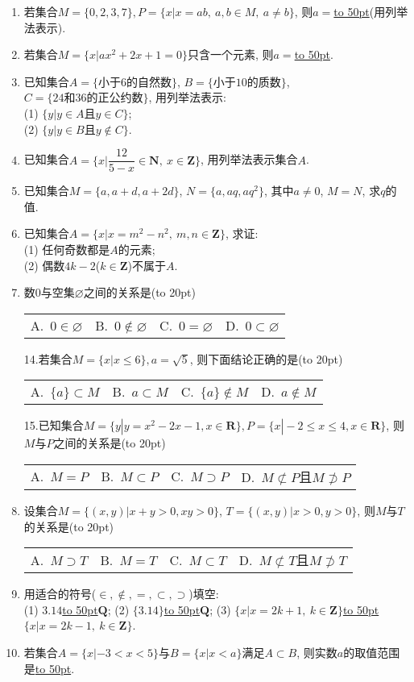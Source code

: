 \documentclass[10pt,a4paper]{article}
\newcommand{\blank}[1]{\underline{\hbox to #1pt{}}}
\newcommand{\bracket}[1]{(\hbox to #1pt{})}
\newcommand{\fourch}[4]{\par\begin{tabular}{p{.23\textwidth}p{.23\textwidth}p{.23\textwidth}p{.23\textwidth}}
A.~#1 &B.~#2& C.~#3& D.~#4
\end{tabular}}
\begin{document}
\begin{enumerate}[1.]
(1) 不大于$6$的非负数整数所组成的集合:\blank{50};\\
(2) 方程$x^3-x^2-x+1=0$的解所组成的集合:\blank{50};\\
(3) $\{y|y=x^2-1, \ |x|\le 2, \ x\in \mathbf{Z}\}$:\blank{50};\\
(4) $\{(x,y)|y =x^2-1, \  |x|\le 2,\ x\in \mathbf{Z}\}$:\blank{50};\\
(5) $\{(x,y)|x+y=5, \ x\in \mathbf{N},\ y\in \mathbf{Z}\}$:\blank{50}.
\item 若集合$M=\{0,2,3,7\},P=\{x|x=ab, \ a,b\in M, \ a\ne b\}$, 则$a=$\blank{50}(用列举法表示).
\item 若集合$M=\{x|ax^2+2x+1=0\}$只含一个元素, 则$a=$\blank{50}.
\item 已知集合$A=\{\text{小于}6\text{的自然数}\}$, $B=\{\text{小于}10\text{的质数}\}$, $C=\{24\text{和}36\text{的正公约数}\}$, 用列举法表示:\\
(1) $\{y|y\in A\text{且}y\in C\}$;\\
(2) $\{y|y\in B\text{且}y\notin C\}$.
\item 已知集合$A=\{x|\dfrac{12}{5-x}\in \mathbf{N},\ x\in\mathbf{Z}\}$, 用列举法表示集合$A$.
\item 已知集合$M=\{a,a+d,a+2d\}$, $N=\{a,aq,aq^2\}$, 其中$a\ne 0$, $M=N$, 求$q$的值.
\item 已知集合$A=\{x|x=m^2-n^2, \ m,n\in \mathbf{Z}\}$, 求证:\\
(1) 任何奇数都是$A$的元素;\\
(2) 偶数$4k-2$($k\in \mathbf{Z}$)不属于$A$.
\item 数0与空集$\varnothing$之间的关系是\bracket{20}
\fourch{$0\in \varnothing$}{$0\notin \varnothing$}{$0=\varnothing$}{$0\subset \varnothing$}14.若集合$M=\{x |x\le 6\},a=\sqrt 5$, 则下面结论正确的是\bracket{20}
\fourch{$\{ a\}\subset M$}{$a\subset M$}{$\{ a\}\notin M$}{$a\notin M$}15.已知集合$M=\{y |y=x^2-2x-1,x\in \mathbf{R}\},P=\{x |-2\le x\le 4,x\in \mathbf{R}\}$, 则$M$与$P$之间的关系是\bracket{20}
\fourch{$M=P$}{$M\subset P$}{$M\supset P$}{$M\not\subset P$且$M\not\supset P$}
\item 设集合$M=\{ (x,y)| x+y>0,xy>0 \}$, $T=\{ (x,y)| x>0,y>0 \}$, 则$M$与$T$的关系是\bracket{20}
\fourch{$M\supset T$}{$M=T$}{$M\subset T$}{$M\not\subset T$且$M\not\supset T$}
\item 用适合的符号($\in,\notin,=,\subset,\supset$)填空:\\
(1) $3.14$\blank{50}$\mathbf{Q}$; (2) $\{3.14\}$\blank{50}$\mathbf{Q}$; (3) $\{x|x=2k+1,\ k\in \mathbf{Z}\}$\blank{50}$\{x|x=2k-1,\ k\in\mathbf{Z}\}$.
\item 若集合$A=\{x|-3<x<5\}$与$B=\{x|x<a\}$满足$A\subset B$, 则实数$a$的取值范围是\blank{50}.

\end{enumerate}
\end{document}
